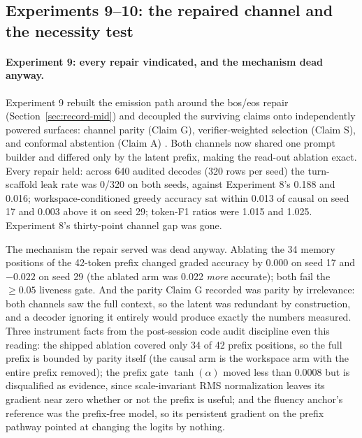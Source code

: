 \documentclass[10pt,a4paper]{article}
\begin{document}
\subsection{Experiments 9--10: the repaired channel and the necessity test}
\label{sec:record-late}

\paragraph{Experiment 9: every repair vindicated, and the mechanism dead anyway.}
Experiment 9 rebuilt the emission path around the bos/eos repair (Section~\ref{sec:record-mid}) and decoupled the surviving claims onto independently powered surfaces: channel parity (Claim G), verifier-weighted selection (Claim S), and conformal abstention (Claim A) \cite{vovk2005,angelopoulos2021}. Both channels now shared one prompt builder and differed only by the latent prefix, making the read-out ablation exact. Every repair held: across 640 audited decodes (320 rows per seed) the turn-scaffold leak rate was 0/320 on both seeds, against Experiment 8's 0.188 and 0.016; workspace-conditioned greedy accuracy sat within 0.013 of causal on seed 17 and 0.003 above it on seed 29; token-F1 ratios were 1.015 and 1.025. Experiment 8's thirty-point channel gap was gone.

The mechanism the repair served was dead anyway. Ablating the 34 memory positions of the 42-token prefix changed graded accuracy by 0.000 on seed 17 and $-0.022$ on seed 29 (the ablated arm was 0.022 \emph{more} accurate); both fail the $\geq 0.05$ liveness gate. And the parity Claim G recorded was parity by irrelevance: both channels saw the full context, so the latent was redundant by construction, and a decoder ignoring it entirely would produce exactly the numbers measured. Three instrument facts from the post-session code audit discipline even this reading: the shipped ablation covered only 34 of 42 prefix positions, so the full prefix is bounded by parity itself (the causal arm is the workspace arm with the entire prefix removed); the prefix gate $\tanh(\alpha)$ moved less than 0.0008 but is disqualified as evidence, since scale-invariant RMS normalization leaves its gradient near zero whether or not the prefix is useful; and the fluency anchor's reference was the prefix-free model, so its persistent gradient on the prefix pathway pointed at changing the logits by nothing.
\end{document}
